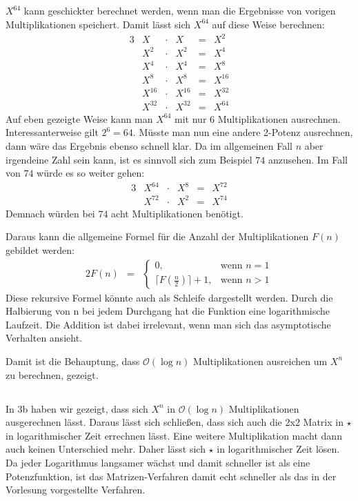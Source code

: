 \documentclass[10pt,a4paper,oneside,ngerman,numbers=noenddot]{scrartcl}
\begin{document}
	\subsection{} %
	$X^{64}$ kann geschickter berechnet werden, wenn man die Ergebnisse von vorigen Multiplikationen speichert. Damit lässt sich $X^{64}$ auf diese Weise berechnen:\\
	\begin{alignat*}{3}
	& X &\cdot & X &=& X^{2} \\
	& X^{2} &\cdot & X^{2} &=& X^{4} \\
	& X^{4} &\cdot & X^{4} &=& X^{8} \\
	& X^{8} &\cdot & X^{8} &=& X^{16} \\
	& X^{16} &\cdot & X^{16} &=& X^{32} \\
	& X^{32} &\cdot & X^{32} &=& X^{64}
	\end{alignat*}
	Auf eben gezeigte Weise kann man $X^{64}$ mit nur $6$ Multiplikationen ausrechnen. Interessanterweise gilt $2^{6} = 64$. Müsste man nun eine andere 2-Potenz ausrechnen, dann wäre das Ergebnis ebenso schnell klar. Da im allgemeinen Fall $n$ aber irgendeine Zahl sein kann, ist es sinnvoll sich zum Beispiel $74$ anzusehen. Im Fall von $74$ würde es so weiter gehen:
	\begin{alignat*}{3}
	& X^{64} &\cdot & X^{8} &=& X^{72} \\
	& X^{72} &\cdot & X^{2} &=& X^{74}
	\end{alignat*}
	Demnach würden bei $74$ acht Multiplikationen benötigt.
	
	Daraus kann die allgemeine Formel für die Anzahl der Multiplikationen $F(n)$ gebildet werden:\\
	\begin{alignat*}{2}
	F(n) &=& \begin{cases}
  0,  & \text{wenn } n = 1\\
  \lceil F(\frac{n}{2}) \rceil + 1, & \text{wenn } n > 1
		\end{cases}
	\end{alignat*}
	Diese rekursive Formel könnte auch als Schleife dargestellt werden. Durch die Halbierung von n bei jedem Durchgang hat die Funktion eine logarithmische Laufzeit. Die Addition ist dabei irrelevant, wenn man sich das asymptotische Verhalten ansieht.
	
	Damit ist die Behauptung, dass $\mathcal{O}(\log n)$ Multiplikationen ausreichen um $X^{n}$ zu berechnen, gezeigt.
	\subsection{} %
	
	In 3b haben wir gezeigt, dass sich $X^{n}$ in $\mathcal{O}(\log n)$ Multiplikationen ausgerechnen lässt. Daraus lässt sich schließen, dass sich auch die 2x2 Matrix in $\star$ in logarithmischer Zeit errechnen lässt. Eine weitere Multiplikation macht dann auch keinen Unterschied mehr. Daher lässt sich $\star$ in logarithmischer Zeit lösen. Da jeder Logarithmus langsamer wächst und damit schneller ist als eine Potenzfunktion, ist das Matrizen-Verfahren damit echt schneller als das in der Vorlesung vorgestellte Verfahren.
\end{document}

